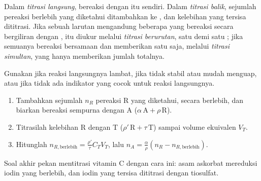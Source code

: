 \begin{definition}\label{def:b1:titration-methods:kinds}
Dalam \emph{titrasi langsung},  bereaksi
dengan  itu sendiri. Dalam
\emph{titrasi balik}, sejumlah pereaksi berlebih yang diketahui ditambahkan ke ,
dan kelebihan yang tersisa dititrasi. Jika sebuah larutan mengandung
beberapa  yang bereaksi secara bergiliran dengan ,
 itu diukur melalui \emph{titrasi
berurutan}, satu  demi satu
; jika semuanya bereaksi bersamaan dan memberikan satu
 saja, melalui
\emph{titrasi simultan}, yang hanya memberikan jumlah totalnya.
\end{definition}

\begin{method}\label{met:b1:titration-methods:back-titration}
Gunakan  jika reaksi langsungnya lambat, jika 
tidak stabil atau mudah menguap, atau jika tidak ada indikator yang cocok
untuk reaksi langsungnya.
\begin{enumerate}
  \item Tambahkan sejumlah $n_R$ pereaksi R yang diketahui, secara
        berlebih, dan biarkan bereaksi sempurna dengan  A
        ($\alpha\,\mathrm{A} + \rho\,\mathrm{R}$).
  \item Titrasilah kelebihan R dengan  T ($\rho'\,\mathrm{R} +
        \tau\,\mathrm{T}$) sampai volume ekuivalen $V_T$.
  \item Hitunglah $n_{R,\text{berlebih}} = \frac{\rho'}{\tau}C_TV_T$, lalu
        $n_A = \frac{\alpha}{\rho}(n_R - n_{R,\text{berlebih}})$.
\end{enumerate}
\end{method}

Soal akhir pekan mentitrasi vitamin C dengan cara ini: asam askorbat
mereduksi iodin yang berlebih, dan iodin yang tersisa dititrasi dengan
tiosulfat.

